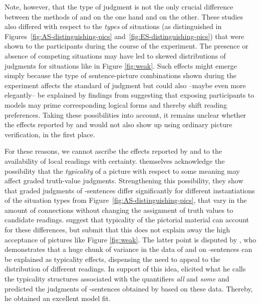 \documentclass[fleqn,reqno,10pt,draft]{article}
\newcommand{\as}{\acro{as}}
\begin{document}
Note, however, that the type of judgment is not the only crucial
difference between the methods of
\citeauthor{CliftonDube2010:Embedded-Implic} and
\citeauthor{ChemlaSpector2010:Experimental-Ev} on the one hand and
\citet{GeurtsPouscoulous2009:Embedded-Implic} on the other. These
studies also differed with respect to the \emph{types} of situations
(as distinguished in Figures~\ref{fig:AS-distinguishing-pics}
and~\ref{fig:ES-distinguishing-pics}) that were shown to the
participants during the course of the experiment. The presence or
absence of competing situations may have led to skewed distributions
of judgments for situations like in Figure \ref{fig:weak}. Such
effects might emerge simply because the type of sentence-picture
combinations shown during the experiment affects the standard of
judgment but could also --maybe even more elegantly-- be explained by
findings from \citet{Raffray2010} suggesting that exposing
participants to models may prime corresponding logical forms and
thereby shift reading preferences. Taking these possibilities into
account, it remains unclear whether the effects reported by
\citeauthor{CliftonDube2010:Embedded-Implic} and
\citeauthor{ChemlaSpector2010:Experimental-Ev} would not also show up
using ordinary picture verification, in the first place.

For these reasons, we cannot ascribe the effects reported by
\citeauthor{CliftonDube2010:Embedded-Implic} and
\citeauthor{ChemlaSpector2010:Experimental-Ev} to the availability of
local readings with
certainty. \citet{ChemlaSpector2010:Experimental-Ev} themselves
acknowledge the possibility that the \emph{typicality} of a picture
with respect to some meaning may affect graded truth-value
judgments. Strengthening this possibility, they show that graded
judgments of \as-sentences differ significantly for different
instantiations of the situation types from
Figure~\ref{fig:AS-distinguishing-pics}, that vary in the amount of
connections without changing the assignment of truth values to
candidate readings. \citeauthor{ChemlaSpector2010:Experimental-Ev}
suggest that typicality of the pictorial material can account for
these differences, but submit that this does not explain away the high
acceptance of pictures like Figure \ref{fig:weak}. The latter point is
disputed by \citet{Tielvan-Tiel2012:Embedded-Scalar}, who demonstrates
that a huge chunk of variance in the data of
\citeauthor{CliftonDube2010:Embedded-Implic} and
\citeauthor{ChemlaSpector2010:Experimental-Ev} on \as-sentences can be
explained as typicality effects, dispensing the need to appeal to the
distribution of different readings. In support of this idea,
\citet{Tielvan-Tiel2012:Embedded-Scalar} elicited what he calls the
typicality structures associated with the quantifiers {\it all} and
{\it some} \citep[as done also by][]{DegenTanenhaus2011:Making-Inferenc} and predicted the judgments of \as-sentences obtained by
\citeauthor{ChemlaSpector2010:Experimental-Ev} based on these
data. Thereby, he obtained an excellent model fit. 
\end{document}
